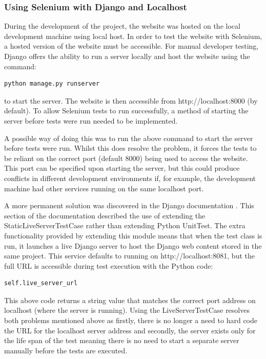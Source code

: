 \subsubsection{Using Selenium with Django and Localhost}
During the development of the project, the website was hosted on the local development machine using local host. In order to test the website with Selenium, a hosted version of the website must be accessible. For manual developer testing, Django offers the ability to run a server locally and host the website using the command: \begin{verbatim}
python manage.py runserver 
\end{verbatim}
to start the server. The website is then accessible from http://localhost:8000 (by default). To allow Selenium tests to run successfully, a method of starting the server before tests were run needed to be implemented.

A possible way of doing this was to run the above command to start the server before tests were run. Whilst this does resolve the problem, it forces the tests to be reliant on the correct port (default 8000) being used to access the website. This port can be specified upon starting the server, but this could produce conflicts in different development environments if, for example, the development machine had other services running on the same localhost  port.

A more permanent solution was discovered in the Django documentation \cite{django_live_server_test}. This section of the documentation described the use of extending the StaticLiveServerTestCase rather than extending Python UnitTest. The extra functionality provided by extending this module means that when the test class is run, it launches a live Django server to host the Django web content stored in the same project. This service defaults to running on http://localhost:8081, but the full URL is accessible during test execution with the Python code:
\begin{verbatim}
self.live_server_url
\end{verbatim}
This above code returns a string value that matches the correct port address on localhost (where the server is running). Using the LiveServerTestCase resolves both problems mentioned above as firstly, there is no longer a need to hard code the URL for the localhost server address and secondly, the server exists only for the life span of the test meaning there is no need to start a separate server manually before the tests are executed.

